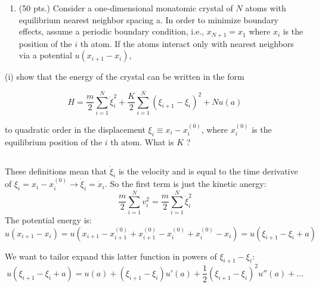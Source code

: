 \documentclass[12pt]{article}
\begin{document}
\begin{enumerate}
\section{}
  \item (50 pts.) Consider a one-dimensional monatomic crystal of $N$ atoms with equilibrium nearest neighbor spacing a. In order to minimize boundary effects, assume a periodic boundary condition, i.e., $x_{N+1}=x_{1}$ where $x_{i}$ is the position of the $i$ th atom. If the atoms interact only with nearest neighbors via a potential $u\left(x_{i+1}-x_{i}\right)$,

\end{enumerate}

(i) show that the energy of the crystal can be written in the form


\begin{equation*}
H=\frac{m}{2} \sum_{i=1}^{N} \dot{\xi}_{i}^{2}+\frac{K}{2} \sum_{i=1}^{N}\left(\xi_{i+1}-\xi_{i}\right)^{2}+N u(a) \tag{6}
\end{equation*}


to quadratic order in the displacement $\xi_{i} \equiv x_{i}-x_{i}^{(0)}$, where $x_{i}^{(0)}$ is the equilibrium position of the $i$ th atom. What is $K$ ?
\subsection{}
\subsubsection{}
These definitions mean that $\dot{\xi}_{i}$ is the velocity and is equal to the time derivative of $\xi_{i}=x_{i}-x_{i}^{(0)}\rightarrow \dot{\xi}_{i}=\dot{x}_{i}$. So the first term is just the kinetic anergy:
\begin{equation}
  \frac{m}{2}\sum_{i=1}^{N} v_{i}^{2} = \frac{m}{2}\sum_{i=1}^{N} \dot{\xi}_{i}^{2}
\end{equation}
The potential energy is:
\begin{equation}
  u(x_{i+1}-x_{i}) = u(x_{i+1}-x_{i+1}^{(0)}+x_{i+1}^{(0)}-x_{i}^{(0)}+x_{i}^{(0)}-x_{i}) = u(\xi_{i+1}-\xi_{i}+a)
\end{equation}

We want to tailor expand this latter function in powers of $\xi_{i+1}-\xi_{i}$:
\begin{equation}
  u(\xi_{i+1}-\xi_{i}+a) = u(a) + \left(\xi_{i+1}-\xi_{i}\right)u'(a) + \frac{1}{2}\left(\xi_{i+1}-\xi_{i}\right)^2u''(a) + \ldots
\end{equation}
\end{document}
